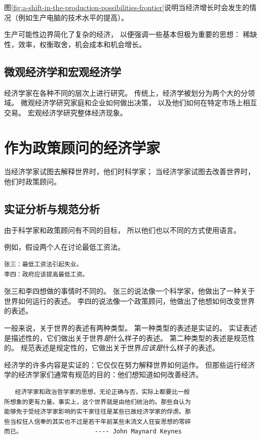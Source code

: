 图\ref{fig:a-shift-in-the-production-possibilities-frontier}说明当经济增长时会发生的情况（例如生产电脑的技术水平的提高）。



生产可能性边界简化了复杂的经济，
以便强调一些基本但极为重要的思想：
稀缺性，效率，权衡取舍，机会成本和机会增长。




\subsection{微观经济学和宏观经济学}

经济学家在各种不同的层次上进行研究。
传统上，经济学被划分为两个大的分领域。
微观经济学研究家庭和企业如何做出决策，
以及他们如何在特定市场上相互交易。
宏观经济学研究整体经济现象。


\section{作为政策顾问的经济学家}

当经济学家试图去解释世界时，他们时科学家；
当经济学家试图去改善世界时，他们时政策顾问。



\subsection{实证分析与规范分析}

由于科学家和政策顾问有不同的目标，
所以他们也以不同的方式使用语言。


例如，假设两个人在讨论最低工资法。
\begin{verbatim}
张三：最低工资法引起失业。
李四：政府应该提高最低工资。
\end{verbatim}

张三和李四想做的事情时不同的。
张三的说法像一个科学家，他做出了一种关于世界如何运行的表述。
李四的说法像一个政策顾问，他做出了他想如何改变世界的表述。


一般来说，关于世界的表述有两种类型。
第一种类型的表述是实证的。
实证表述是描述性的，它们做出关于世界\emph{是}什么样子的表述。
第二种类型的表述是规范性的。
规范表述是规定性的，它做出关于世界\emph{应该是}什么样子的表述。


经济学的许多内容是实证的：它仅仅在努力解释世界如何运作。
但那些运行经济学的经济学家们通常有规范的目的：他们想知道如何改善经济。


\begin{verbatim}
   经济学家和政治哲学家的思想，无论正确与否，实际上都要比一般
所想象的更有力量。事实上，这个世界就是由他们统治的。那些自认为
能够免于受经济学家影响的实干家往往是某些已故经济学家的俘虏。那
些当权狂人信奉的其实也不过是若干年前某些末流文人狂妄思想的零碎
而已。                    ---- John Maynard Keynes
\end{verbatim}


